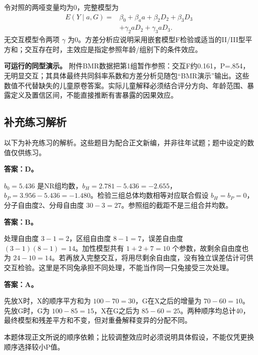 令对照的两哑变量均为0，完整模型为 \[\begin{aligned}E(Y\mid a,G)={}&\beta_0+\beta_a a+\beta_2D_2+\beta_3D_3\\&+\gamma_2aD_2+\gamma_3aD_3.\end{aligned}\] 无交互模型令两项 \(\gamma\) 为0。方差分析应说明采用嵌套模型F检验或适当的II/III型平方和；交互存在时，主效应是指定参照年龄/组别下的条件效应。

\textbf{可运行的同型演示。} 附件BMR数据把第1组暂作参照：交互F约0.161，P=.854，无明显交互；其具体最终共同斜率系数和方差分析见随包``BMR演示''输出。这些数值不代替缺失的儿童原卷答案。实际儿童解释必须结合评分方向、年龄范围、暴露定义及置信区间，不能直接推断有害暴露的因果效应。

\clearpage\subsection*{补充练习解析}

以下为补充练习的解析。这些题目为配合正文新编，并非往年试题；题中设定的数值仅供练习。


\textbf{答案：D。}

\(b_0=5.436\) 是NR组均数，\(b_H=2.781-5.436=-2.655\)，\(b_P=3.956-5.436=-1.480\)。检验三组总体均数相等对应联合假设 \(b_H=b_P=0\)，分子自由度2、分母自由度 \(30-3=27\)。参照组的截距不是三组合并均数。





\textbf{答案：B。}

处理自由度 \(3-1=2\)，区组自由度 \(8-1=7\)，误差自由度 \((3-1)(8-1)=14\)。加性模型共有 \(1+2+7=10\) 个参数，故剩余自由度也为 \(24-10=14\)。若再放入完整交互，将用尽剩余自由度，没有独立误差估计可供交互检验。这里是不同兔承担不同处理，不能当作同一只兔接受三次处理。





\textbf{答案：A。}

先放X时，X的顺序平方和为 \(100-70=30\)，G在X之后的增量为 \(70-60=10\)。先放G时，G为 \(100-85=15\)，X在G之后为 \(85-60=25\)。两种顺序均总计40，最终模型和残差平方和不变，但对重叠解释变异的分配不同。

本题体现正文所说的顺序依赖；比较调整效应时必须说明具体假设，不能仅凭更换顺序选择较小P值。





